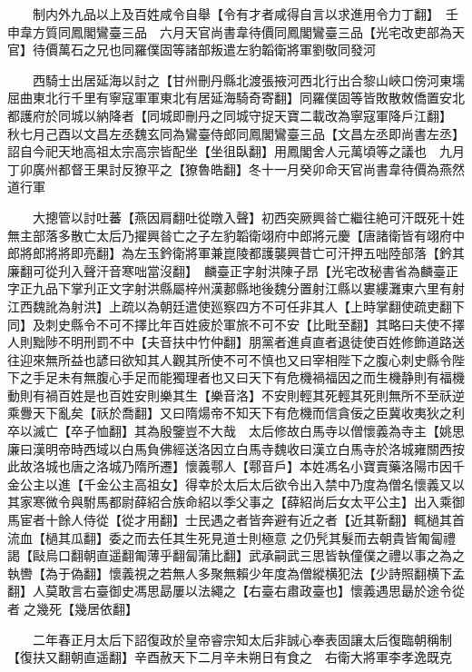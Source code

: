 　　制内外九品以上及百姓咸令自舉【令有才者咸得自言以求進用令力丁翻】　壬申韋方質同鳳閣鸞臺三品　六月天官尚書韋待價同鳳閣鸞臺三品【光宅改吏部為天官】待價萬石之兄也同羅僕固等諸部叛遣左豹韜衛將軍劉敬同發河

　　西騎士出居延海以討之【甘州刪丹縣北渡張掖河西北行出合黎山峽口傍河東壖屈曲東北行千里有寧寇軍軍東北有居延海騎奇寄翻】同羅僕固等皆敗散敇僑置安北都護府於同城以納降者【同城即刪丹之同城守捉天寶二載改為寧寇軍降戶江翻】　秋七月己酉以文昌左丞魏玄同為鸞臺侍郎同鳳閣鸞臺三品【文昌左丞即尚書左丞】　詔自今祀天地高祖太宗高宗皆配坐【坐徂臥翻】用鳳閣舍人元萬頃等之議也　九月丁卯廣州都督王果討反獠平之【獠魯皓翻】冬十一月癸卯命天官尚書韋待價為燕然道行軍

　　大摠管以討吐蕃【燕因肩翻吐從暾入聲】初西突厥興㫺亡繼往絶可汗既死十姓無主部落多散亡太后乃擢興㫺亡之子左豹韜衛翊府中郎將元慶【唐諸衛皆有翊府中郎將郎將將即亮翻】為左玉鈐衛將軍兼崑陵都護襲興昔亡可汗押五咄陸部落【鈐其廉翻可從刋入聲汗音寒咄當沒翻】　麟臺正字射洪陳子昂【光宅改秘書省為麟臺正字正九品下掌刋正文字射洪縣屬梓州漢郪縣地後魏分置射江縣以婁縷灘東六里有射江西魏訛為射洪】上疏以為朝廷遣使廵察四方不可任非其人【上時掌翻使疏吏翻下同】及刺史縣令不可不擇比年百姓疲於軍旅不可不安【比毗至翻】其略曰夫使不擇人則黜陟不明刑罰不中【夫音扶中竹仲翻】朋黨者進貞直者退徒使百姓修飾道路送往迎來無所益也諺曰欲知其人觀其所使不可不慎也又曰宰相陛下之腹心刺史縣令陛下之手足未有無腹心手足而能獨理者也又曰天下有危機禍福因之而生機静則有福機動則有禍百姓是也百姓安則樂其生【樂音洛】不安則輕其死輕其死則無所不至祅逆乘釁天下亂矣【祅於喬翻】又曰隋煬帝不知天下有危機而信貪佞之臣冀收夷狄之利卒以滅亡【卒子恤翻】其為殷鑒豈不大哉　太后修故白馬寺以僧懷義為寺主【姚思廉曰漢明帝時西域以白馬負佛經送洛因立白馬寺魏收曰漢立白馬寺於洛城雍關西按此故洛城也唐之洛城乃隋所遷】懷義鄠人【鄠音戶】本姓馮名小寶賣藥洛陽市因千金公主以進【千金公主高祖女】得幸於太后太后欲令出入禁中乃度為僧名懷義又以其家寒微令與駙馬都尉薛紹合族命紹以季父事之【薛紹尚后女太平公主】出入乘御馬宦者十餘人侍從【從才用翻】士民遇之者皆奔避有近之者【近其靳翻】輒檛其首流血【檛其瓜翻】委之而去任其生死見道士則極意之仍髠其髮而去朝貴皆匍匐禮謁【敺烏口翻朝直遥翻匍薄乎翻匐蒲比翻】武承嗣武三思皆執僮僕之禮以事之為之執轡【為于偽翻】懷義視之若無人多聚無賴少年度為僧縱横犯法【少詩照翻横下孟翻】人莫敢言右臺御史馮思勗屢以法繩之【右臺右肅政臺也】懷義遇思朂於途令從者之幾死【幾居依翻】

　　二年春正月太后下詔復政於皇帝睿宗知太后非誠心奉表固讓太后復臨朝稱制【復扶又翻朝直遥翻】辛酉赦天下二月辛未朔日有食之　右衛大將軍李孝逸既克


